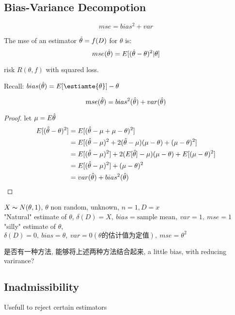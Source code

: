 \documentclass{article}
\begin{document}
\subsection{Bias-Variance Decompotion}
$$mse = bias^2 + var$$
\begin{definition}
The mse of an estimator $\hat{\theta} = f(D)$ for $\theta$ is:
$$mse(\hat{\theta}) = E[(\hat{\theta} - \theta)^2 | \theta]$$
\end{definition}
risk $R(\theta, f)$ with squared loss.

Recall: $bias(\estimate{\theta}) = E[\estiamte{\theta}] - \theta$

\begin{proposition}
$$mse(\hat{\theta} ) = bias^2(\hat{\theta} ) + var(\hat{\theta} )$$
\end{proposition}
\begin{proof}
let $\mu = E\hat{\theta} $
$$
\begin{aligned}
E[(\hat{\theta} - \theta )^2]
& = E[(\hat{\theta} - \mu + \mu - \theta )^2] \\
& = E[(\hat{\theta} - \mu)^2 +  2 (\hat{\theta} - \mu) (\mu - \theta) + (\mu - \theta)^2] \\
& = E[(\hat{\theta} - \mu)^2] +  2 (E[\hat{\theta}] - \mu) (\mu - \theta) + E[(\mu - \theta)^2] \\
& = E[(\hat{\theta} - \mu)^2] + (\mu - \theta)^2 \\
& = var(\hat{\theta}) + bias^2(\hat{\theta})
\end{aligned}
$$
\end{proof}

\begin{example}
$X \thicksim{N}(\theta, 1)$, $\theta$ non random, unknown, $n=1, D=x$\\
"Natural" estimate of $\theta$, $\delta(D) = X,\ bias = \text{sample mean},\ var = 1,\ mse = 1$
"silly" estimate of $\theta$, $\delta(D) = 0,\ bias = \theta,\ var = 0(\text{$\theta$的估计值为定值}),\ mse = \theta^2$

是否有一种方法, 能够将上述两种方法结合起来, a little bias, with reducing varirance?
\end{example}

\subsection{Inadmissibility}
Usefull to reject certain estimators
\end{document}
